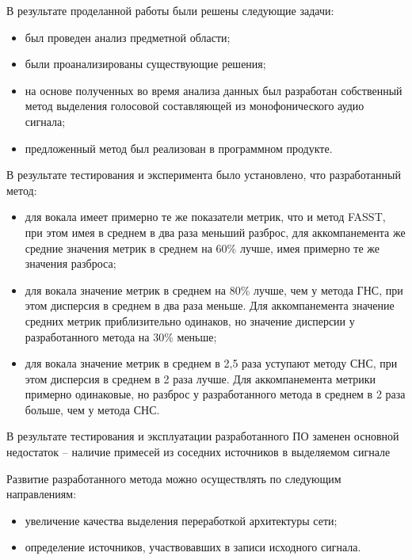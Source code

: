 \Conclusion %

В результате проделанной работы были решены следующие задачи:

\begin{itemize}
	\item был проведен анализ предметной области;
	\item были проанализированы существующие решения;
	\item на основе полученных во время анализа данных был разработан собственный метод выделения голосовой составляющей из монофонического аудио сигнала;
	\item предложенный метод был реализован в программном продукте.
\end{itemize}

В результате тестирования и эксперимента было установлено, что разработанный метод:

\begin{itemize}
	\item для вокала имеет примерно те же показатели метрик, что и метод FASST, при этом имея в среднем в два раза меньший разброс, для аккомпанемента же средние значения метрик в среднем на 60\% лучше, имея примерно те же значения разброса;
	\item для вокала значение метрик в среднем на 80\% лучше, чем у метода ГНС, при этом дисперсия в среднем в два раза меньше. Для аккомпанемента значение средних метрик приблизительно одинаков, но значение дисперсии у разработанного метода на 30\% меньше;
	\item для вокала значение метрик в среднем в 2,5 раза уступают методу СНС, при этом дисперсия в среднем в 2 раза лучше. Для аккомпанемента метрики примерно одинаковые, но разброс у разработанного метода в среднем в 2 раза больше, чем у метода СНС.
\end{itemize}

В результате тестирования и эксплуатации разработанного ПО заменен основной недостаток -- наличие примесей из соседних источников в выделяемом сигнале

Развитие разработанного метода можно осуществлять по следующим направлениям:

\begin{itemize}
	\item увеличение качества выделения переработкой архитектуры сети;
	\item определение источников, участвовавших в записи исходного сигнала.
\end{itemize}


